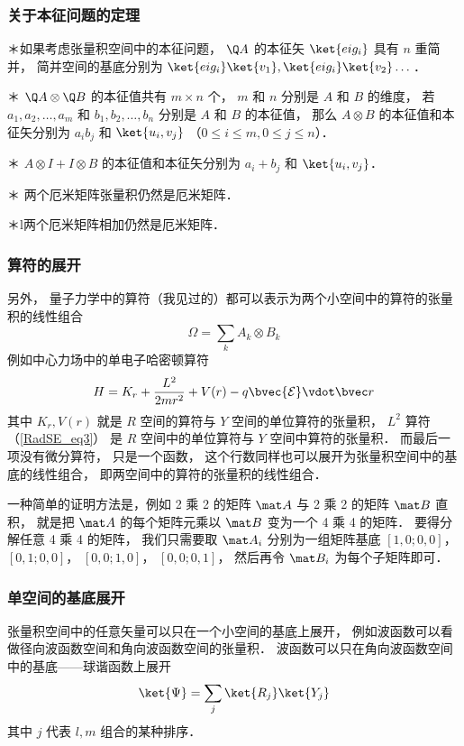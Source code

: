 \subsubsection{关于本征问题的定理}%
	
＊如果考虑张量积空间中的本征问题， $\Q A$  的本征矢 $\ket{eig_i}$ 具有 $n$ 重简并， 简并空间的基底分别为 $\ket{eig_i}\ket{v_1}, \ket{eig_i}\ket{v_2}\dots$． 

＊ $\Q A \otimes \Q B$ 的本征值共有 $m \times n$ 个， $m$ 和 $n$ 分别是 $A$ 和 $B$ 的维度， 若 $a_1, a_2,\dots, a_m$ 和 $b_1, b_2, \dots, b_n$ 分别是 $A$ 和 $B$ 的本征值， 那么 $A \otimes B$ 的本征值和本征矢分别为 $a_i b_j$ 和 $\ket{u_i, v_j}$ （$0 \leqslant i \leqslant m,  0 \leqslant j \leqslant n$）．

＊ $A \otimes I + I \otimes B$ 的本征值和本征矢分别为 $a_i + b_j$ 和 $\ket{u_i, v_j}$． 

＊ 两个厄米矩阵张量积仍然是厄米矩阵．

＊l两个厄米矩阵相加仍然是厄米矩阵．

\subsubsection{算符的展开}
另外， 量子力学中的算符（我见过的）都可以表示为两个小空间中的算符的张量积的线性组合
\begin{equation}
\Omega = \sum_k A_k \otimes B_k
\end{equation}
例如中心力场中的单电子哈密顿算符
\begin{equation}
H = K_r + \frac{L^2}{2mr^2} + V(r) - q\bvec{\mathcal{E}} \vdot \bvec r
\end{equation}
其中 $K_r, V(r)$ 就是 $R$ 空间的算符与 $Y$ 空间的单位算符的张量积， $L^2$ 算符（\autoref{RadSE_eq3}） 是 $R$ 空间中的单位算符与 $Y$ 空间中算符的张量积． 而最后一项没有微分算符， 只是一个函数， 这个行数同样也可以展开为张量积空间中的基底的线性组合， 即两空间中的算符的张量积的线性组合．

一种简单的证明方法是，例如 2 乘 2 的矩阵 $\mat A$ 与 2 乘 2 的矩阵 $\mat B$ 直积， 就是把 $\mat A$ 的每个矩阵元乘以 $\mat B$ 变为一个 4 乘 4 的矩阵． 要得分解任意 4 乘 4 的矩阵， 我们只需要取 $\mat A_i$ 分别为一组矩阵基底 $[1, 0; 0, 0]$， $[0, 1; 0, 0]$， $[0, 0; 1, 0]$， $[0, 0; 0, 1]$， 然后再令 $\mat B_i$ 为每个子矩阵即可．

\subsubsection{单空间的基底展开}
张量积空间中的任意矢量可以只在一个小空间的基底上展开， 例如波函数可以看做径向波函数空间和角向波函数空间的张量积． 波函数可以只在角向波函数空间中的基底——球谐函数上展开
\begin{equation}
\ket{\Psi} = \sum_j \ket{R_j}\ket{Y_j}
\end{equation}
其中 $j$ 代表 $l, m$ 组合的某种排序．

